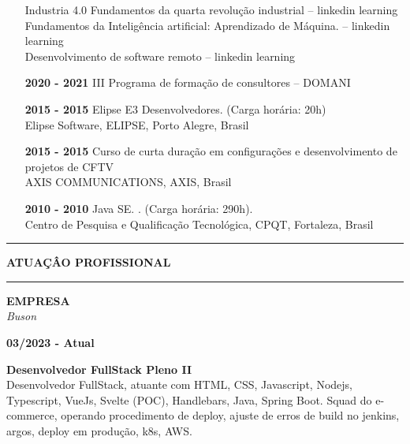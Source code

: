 \documentclass[12pt, a4paper]{article}
\newcommand{\LlinhaG}{2pt} %
\newcommand{\TlinhaG}{17cm}  %
\newcommand{\LlinhaM}{1pt} 	 %
\newcommand{\TlinhaM}{17cm}		 %
\begin{document}
\begin{itemize}
		Industria 4.0 Fundamentos da quarta revolução industrial – linkedin learning\\
		Fundamentos da Inteligência artificial: Aprendizado de Máquina. – linkedin learning\\
		Desenvolvimento de software remoto – linkedin learning
	\item[\textbf{2020 - 2021}] III Programa de formação de consultores – DOMANI\\
	\item[\textbf{2015 - 2015}] Elipse E3 Desenvolvedores. (Carga horária: 20h)\\
		Elipse Software, ELIPSE, Porto Alegre, Brasil
	\item[\textbf{2015 - 2015}] Curso de curta duração em configurações e desenvolvimento de projetos de CFTV\\
		AXIS COMMUNICATIONS, AXIS, Brasil
	\item[\textbf{2010 - 2010}] Java SE. . (Carga horária: 290h).\\
		Centro de Pesquisa e Qualificação Tecnológica, CPQT, Fortaleza, Brasil
\end{itemize}


\clearpage
\begin{center}	%
	\rule{\TlinhaG}{\LlinhaG}
\end{center}

\begin{center}
	\textbf{ATUAÇÂO PROFISSIONAL}\\
\end{center}

\begin{center} %
	\rule{\TlinhaM}{\LlinhaM}
\end{center}

\begin{multicols}{2}
	\begin{flushleft}
		\textbf{EMPRESA}\\
		\textit{Buson}\\
	\end{flushleft}
	\vfill
	\begin{flushright}
		\textbf{03/2023 - Atual}\\
	\end{flushright}
\end{multicols}
\begin{flushleft}
	\textbf{Desenvolvedor FullStack Pleno II}\\
	Desenvolvedor FullStack, atuante com HTML, CSS, Javascript, Nodejs, Typescript, VueJs, Svelte (POC), Handlebars,
	Java, Spring Boot. Squad  do e-commerce, operando procedimento de deploy, ajuste de erros de build no jenkins, argos, deploy em produção, k8s, AWS.
\end{flushleft}
\end{document}
